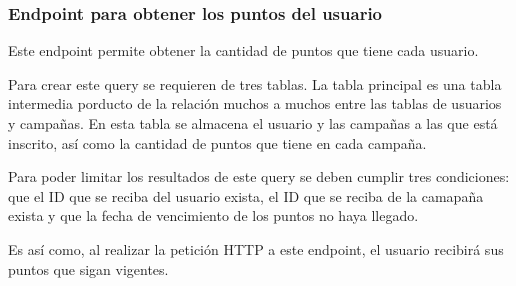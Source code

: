 \subsubsection{Endpoint para obtener los puntos del usuario}
Este endpoint permite obtener la cantidad de puntos que tiene cada usuario.

Para crear este query se requieren de tres tablas. La tabla principal es una tabla intermedia porducto de la relación muchos a muchos entre las tablas de usuarios y campañas. En esta tabla se almacena el usuario y las campañas a las que está inscrito, así como la cantidad de puntos que tiene en cada campaña.

Para poder limitar los resultados de este query se deben cumplir tres condiciones: que el ID que se reciba del usuario exista, el ID que se reciba de la camapaña exista y que la fecha de vencimiento de los puntos no haya llegado.

Es así como, al realizar la petición HTTP a este endpoint, el usuario recibirá sus puntos que sigan vigentes.